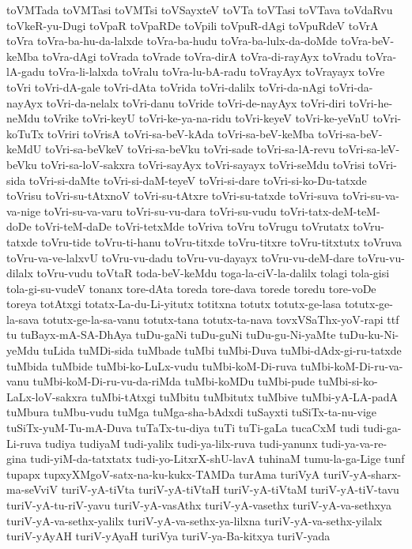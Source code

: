 {toVMTada
toVMTasi
toVMTsi
toVSayxteV
toVTa
toVTasi
toVTava
toVdaRvu
toVkeR-yu-Dugi
toVpaR
toVpaRDe
toVpili
toVpuR-dAgi
toVpuRdeV
toVrA
toVra
toVra-ba-hu-da-lalxde
toVra-ba-hudu
toVra-ba-lulx-da-doMde
toVra-beV-keMba
toVra-dAgi
toVrada
toVrade
toVra-dirA
toVra-di-rayAyx
toVradu
toVra-lA-gadu
toVra-li-lalxda
toVralu
toVra-lu-bA-radu
toVrayAyx
toVrayayx
toVre
toVri
toVri-dA-gale
toVri-dAta
toVrida
toVri-dalilx
toVri-da-nAgi
toVri-da-nayAyx
toVri-da-nelalx
toVri-danu
toVride
toVri-de-nayAyx
toVri-diri
toVri-he-neMdu
toVrike
toVri-keyU
toVri-ke-ya-na-ridu
toVri-keyeV
toVri-ke-yeVnU
toVri-koTuTx
toVriri
toVrisA
toVri-sa-beV-kAda
toVri-sa-beV-keMba
toVri-sa-beV-keMdU
toVri-sa-beVkeV
toVri-sa-beVku
toVri-sade
toVri-sa-lA-revu
toVri-sa-leV-beVku
toVri-sa-loV-sakxra
toVri-sayAyx
toVri-sayayx
toVri-seMdu
toVrisi
toVri-sida
toVri-si-daMte
toVri-si-daM-teyeV
toVri-si-dare
toVri-si-ko-Du-tatxde
toVrisu
toVri-su-tAtxnoV
toVri-su-tAtxre
toVri-su-tatxde
toVri-suva
toVri-su-va-va-nige
toVri-su-va-varu
toVri-su-vu-dara
toVri-su-vudu
toVri-tatx-deM-teM-doDe
toVri-teM-daDe
toVri-tetxMde
toVriva
toVru
toVrugu
toVrutatx
toVru-tatxde
toVru-tide
toVru-ti-hanu
toVru-titxde
toVru-titxre
toVru-titxtutx
toVruva
toVru-va-ve-lalxvU
toVru-vu-dadu
toVru-vu-dayayx
toVru-vu-deM-dare
toVru-vu-dilalx
toVru-vudu
toVtaR
toda-beV-keMdu
toga-la-ciV-la-dalilx
tolagi
tola-gisi
tola-gi-su-vudeV
tonanx
tore-dAta
toreda
tore-dava
torede
toredu
tore-voDe
toreya
totAtxgi
totatx-La-du-Li-yitutx
totitxna
totutx
totutx-ge-lasa
totutx-ge-la-sava
totutx-ge-la-sa-vanu
totutx-tana
totutx-ta-nava
tovxVSaThx-yoV-rapi
ttf
tu
tuBayx-mA-SA-DhAya
tuDu-gaNi
tuDu-guNi
tuDu-gu-Ni-yaMte
tuDu-ku-Ni-yeMdu
tuLida
tuMDi-sida
tuMbade
tuMbi
tuMbi-Duva
tuMbi-dAdx-gi-ru-tatxde
tuMbida
tuMbide
tuMbi-ko-LuLx-vudu
tuMbi-koM-Di-ruva
tuMbi-koM-Di-ru-va-vanu
tuMbi-koM-Di-ru-vu-da-riMda
tuMbi-koMDu
tuMbi-pude
tuMbi-si-ko-LaLx-loV-sakxra
tuMbi-tAtxgi
tuMbitu
tuMbitutx
tuMbive
tuMbi-yA-LA-padA
tuMbura
tuMbu-vudu
tuMga
tuMga-sha-bAdxdi
tuSayxti
tuSiTx-ta-nu-vige
tuSiTx-yuM-Tu-mA-Duva
tuTaTx-tu-diya
tuTi
tuTi-gaLa
tucaCxM
tudi
tudi-ga-Li-ruva
tudiya
tudiyaM
tudi-yalilx
tudi-ya-lilx-ruva
tudi-yanunx
tudi-ya-va-re-gina
tudi-yiM-da-tatxtatx
tudi-yo-LitxrX-shU-lavA
tuhinaM
tumu-la-ga-Lige
tunf
tupapx
tupxyXMgoV-satx-na-ku-kukx-TAMDa
turAma
turiVyA
turiV-yA-sharx-ma-seVviV
turiV-yA-tiVta
turiV-yA-tiVtaH
turiV-yA-tiVtaM
turiV-yA-tiV-tavu
turiV-yA-tu-riV-yavu
turiV-yA-vasAthx
turiV-yA-vasethx
turiV-yA-va-sethxya
turiV-yA-va-sethx-yalilx
turiV-yA-va-sethx-ya-lilxna
turiV-yA-va-sethx-yilalx
turiV-yAyAH
turiV-yAyaH
turiVya
turiV-ya-Ba-kitxya
turiV-yada
}
